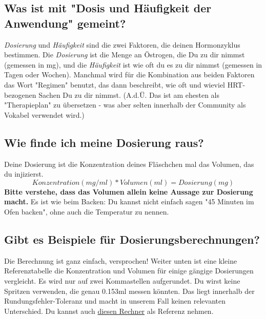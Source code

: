 \documentclass{article}
\begin{document}
{\subsection{Was ist mit "Dosis und Häufigkeit der Anwendung" gemeint?}

\textit{Dosierung} und \textit{Häufigkeit} sind die zwei Faktoren, die deinen Hormonzyklus bestimmen. Die \textit{Dosierung} ist die Menge an Östrogen, die Du zu dir nimmst (gemessen in mg), und die \textit{Häufigkeit} ist wie oft du es zu dir nimmst (gemessen in Tagen oder Wochen). Manchmal wird für die Kombination aus beiden Faktoren das Wort "Regimen" benutzt, das dann beschreibt, wie oft und wieviel HRT-bezogenen Sachen Du zu dir nimmst. (A.d.Ü. 
 Das ist am ehesten als "Therapieplan" zu übersetzen - was aber selten innerhalb der Community als Vokabel verwendet wird.)

\subsection{Wie finde ich meine Dosierung raus?}

Deine Dosierung ist die Konzentration deines Fläschchen mal das Volumen, das du injizierst. \[Konzentration (mg/ml) * Volumen (ml) = Dosierung (mg)\] \textbf{Bitte verstehe, dass das Volumen allein keine Aussage zur Dosierung macht.} Es ist wie beim Backen: Du kannst nicht einfach sagen "45 Minuten im Ofen backen", ohne auch die Temperatur zu nennen. 

\subsection{Gibt es Beispiele für Dosierungsberechnungen?}

Die Berechnung ist ganz einfach, versprochen! Weiter unten ist eine kleine Referenztabelle die Konzentration und Volumen für einige gängige Dosierungen vergleicht. Es wird nur auf zwei Kommastellen aufgerundet. Du wirst keine Spritzen verwenden, die genau 0.153ml messen könnten. Das liegt innerhalb der Rundungsfehler-Toleranz und macht in unserem Fall keinen relevanten Unterschied. Du kannst auch \href{https://hrtcafe.net/Calc/}{diesen Rechner} als Referenz nehmen.

}
\end{document}
